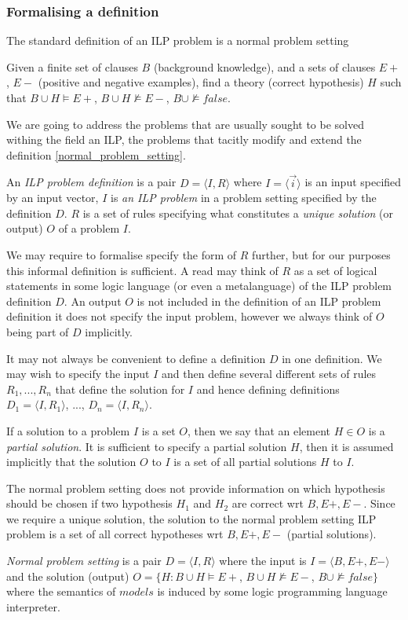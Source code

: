 \subsubsection{Formalising a definition}
The standard definition of an ILP problem is a normal problem setting\cite{nienhuys1997foundations}
\begin{defn}\label{normal_problem_setting}
Given a finite set of clauses $B$ (background knowledge),
and a sets of clauses $E+$, $E-$ (positive and negative examples),
find a theory (correct hypothesis) $H$ such that $B \cup H \models E+$,
$B \cup H \not\models E-$, $B \cup \not\models false$.
\end{defn}

We are going to address the problems that are usually sought to be solved withing the field an ILP, the problems that tacitly modify and extend the definition \ref{normal_problem_setting}.

\begin{defn}
An \emph{ILP problem definition} is a pair $D=\langle I, R \rangle$ where
$I=\langle \overrightarrow{i} \rangle$ is an input specified by an input vector,
$I$ is \emph{an ILP problem} in a problem setting specified by the definition $D$.
$R$ is a set of rules specifying what constitutes a \emph{unique solution} (or output) $O$ of a problem $I$.
\end{defn}
We may require to formalise specify the form of $R$ further, but for our purposes this informal definition is sufficient. A read may think of $R$ as a set of logical statements in some logic language (or even a metalanguage) of the ILP problem definition $D$. An output $O$ is not included in the definition of an ILP problem definition it does not specify the input problem, however we always think of $O$ being part of $D$ implicitly.

It may not always be convenient to define a definition $D$ in one definition. We may wish to specify the input $I$ and then define several different sets of rules $R_1, ..., R_n$ that define the solution for $I$ and hence defining definitions $D_1=\langle I, R_1\rangle$, ..., $D_n=\langle I, R_n \rangle$.

If a solution to a problem $I$ is a set $O$, then we say that an element $H \in O$ is a \emph{partial solution}. It is sufficient to specify a partial solution $H$, then it is assumed implicitly that the solution $O$ to $I$ is a set of all partial solutions $H$ to $I$.

The normal problem setting does not provide information on which hypothesis should be chosen if two hypothesis $H_1$ and $H_2$ are correct wrt $B, E+, E-$. Since we require a unique solution, the solution to the normal problem setting ILP problem is a set of all correct hypotheses wrt $B, E+, E-$ (partial solutions).
\begin{defn}
\emph{Normal problem setting} is a pair $D=\langle I, R \rangle$ where
the input is $I=\langle B, E+, E- \rangle$ and the solution (output)
$O=\{ H : B \cup H \models E+$, $B \cup H \not\models E-$, $B \cup \not\models false \}$ where the semantics of $models$ is induced by some logic programming language interpreter.
\end{defn}

